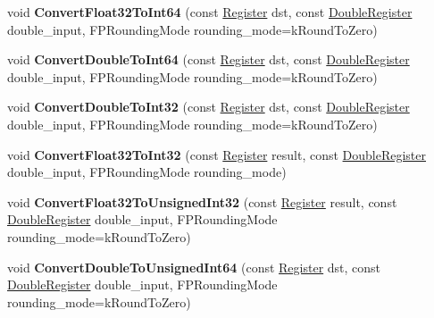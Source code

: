 \begin{DoxyCompactItemize}
void {\bfseries Convert\+Float32\+To\+Int64} (const \mbox{\hyperlink{classv8_1_1internal_1_1Register}{Register}} dst, const \mbox{\hyperlink{classv8_1_1internal_1_1DoubleRegister}{Double\+Register}} double\+\_\+input, F\+P\+Rounding\+Mode rounding\+\_\+mode=k\+Round\+To\+Zero)
\item 
\mbox{\label{classv8_1_1internal_1_1TurboAssembler_a930d162616c160dc1e55ba756915d50a}} 
void {\bfseries Convert\+Double\+To\+Int64} (const \mbox{\hyperlink{classv8_1_1internal_1_1Register}{Register}} dst, const \mbox{\hyperlink{classv8_1_1internal_1_1DoubleRegister}{Double\+Register}} double\+\_\+input, F\+P\+Rounding\+Mode rounding\+\_\+mode=k\+Round\+To\+Zero)
\item 
\mbox{\label{classv8_1_1internal_1_1TurboAssembler_abe0bc5ad42da90fc7ce672e34806a4e1}} 
void {\bfseries Convert\+Double\+To\+Int32} (const \mbox{\hyperlink{classv8_1_1internal_1_1Register}{Register}} dst, const \mbox{\hyperlink{classv8_1_1internal_1_1DoubleRegister}{Double\+Register}} double\+\_\+input, F\+P\+Rounding\+Mode rounding\+\_\+mode=k\+Round\+To\+Zero)
\item 
\mbox{\label{classv8_1_1internal_1_1TurboAssembler_a94c81f03378568f6b309d019978a10b9}} 
void {\bfseries Convert\+Float32\+To\+Int32} (const \mbox{\hyperlink{classv8_1_1internal_1_1Register}{Register}} result, const \mbox{\hyperlink{classv8_1_1internal_1_1DoubleRegister}{Double\+Register}} double\+\_\+input, F\+P\+Rounding\+Mode rounding\+\_\+mode)
\item 
\mbox{\label{classv8_1_1internal_1_1TurboAssembler_aa28bc18d69c93c76e154627aadfda14e}} 
void {\bfseries Convert\+Float32\+To\+Unsigned\+Int32} (const \mbox{\hyperlink{classv8_1_1internal_1_1Register}{Register}} result, const \mbox{\hyperlink{classv8_1_1internal_1_1DoubleRegister}{Double\+Register}} double\+\_\+input, F\+P\+Rounding\+Mode rounding\+\_\+mode=k\+Round\+To\+Zero)
\item 
\mbox{\label{classv8_1_1internal_1_1TurboAssembler_a4232c90005def82ba1a4996f5888ce3a}} 
void {\bfseries Convert\+Double\+To\+Unsigned\+Int64} (const \mbox{\hyperlink{classv8_1_1internal_1_1Register}{Register}} dst, const \mbox{\hyperlink{classv8_1_1internal_1_1DoubleRegister}{Double\+Register}} double\+\_\+input, F\+P\+Rounding\+Mode rounding\+\_\+mode=k\+Round\+To\+Zero)

\end{DoxyCompactItemize}
